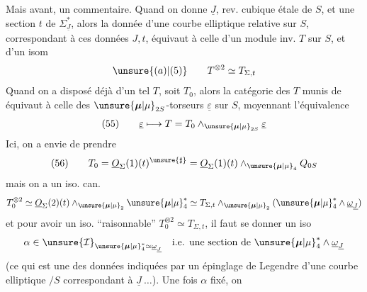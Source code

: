 Mais avant, un commentaire. Quand on
donne $\underline{J}$, rev. cubique étale de $S$, et une
section $t$ de $\Sigma_{\underline{J}}^*$, alors la donnée d'une
courbe elliptique relative sur $S$, correspondant à
ces données $J,t$, équivaut à celle d'un
module inv. $T$ sur $S$, et d'un isom 
\[
\unsure{(a)|(5)}\qquad T^{\otimes2}\simeq T_{\Sigma,t}
\]
Quand on a disposé déjà d'un tel $T$, soit
$T_0$, alors la catégorie des $T$  munis de  équivaut
à celle des $\unsure{\boldsymbol{\mu}|\mu}_{2S}$-torseurs $\underline{\varepsilon}$ sur $S$, moyennant
l'équivalence
\[
(55)\qquad \underline{\varepsilon}\longmapsto T=T_0\wedge_{\unsure{\boldsymbol{\mu}|\mu}_{2S}}\underline{\varepsilon}
\]
Ici, on a envie de prendre
\[
(56)\qquad T_0=\underline{O}_{\Sigma}(1)(t)^{\unsure{\sharp}}
=\underline{O}_{\Sigma}(1)(t)\wedge_{\unsure{\boldsymbol{\mu}|\mu}_4}Q_{0S}
\]
mais on a un iso. can.
\[
T_0^{\otimes2}\simeq\underline{O}_{\Sigma}(2)(t)\wedge_{\unsure{\boldsymbol{\mu}|\mu}_2}\unsure{\boldsymbol{\mu}|\mu}_4^*
\simeq T_{\Sigma,t}\wedge_{\unsure{\boldsymbol{\mu}|\mu}_2}(\unsure{\boldsymbol{\mu}|\mu}_4^*\wedge\underline{\omega}_{\underline{J}})
\]
et pour avoir un iso. ``raisonnable'' $T_0^{\otimes2}\simeq T_{\Sigma,t}$,
il faut se donner un  iso
\[
\alpha\in\unsure{\mathcal{I}}_{\unsure{\boldsymbol{\mu}|\mu}_4^*\simeq\underline{\omega}_{\underline J}}
\quad\text{i.e. une section de }\unsure{\boldsymbol{\mu}|\mu}_4^*\wedge\underline{\omega}_{\underline J}
\]
(ce qui est une des données indiquées par un
épinglage de Legendre d'une courbe elliptique $/S$
correspondant à $\underline{J}\ \ldots$). Une fois $\alpha$ fixé, on
